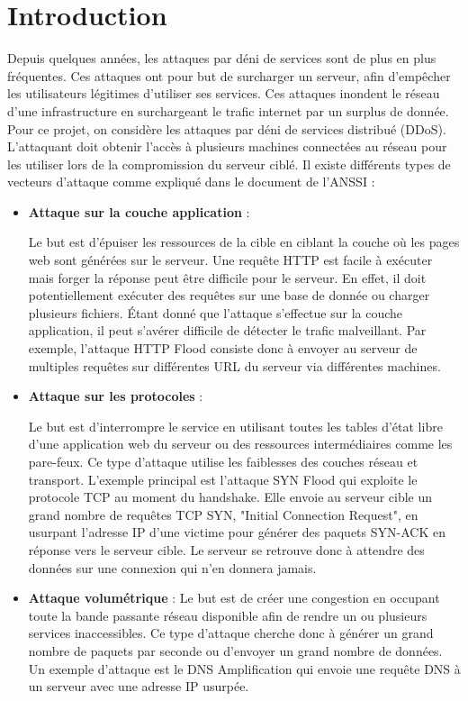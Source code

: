 \chapter*{Introduction}

\label{sec:intro}

Depuis quelques années, les attaques par déni de services sont de plus en plus fréquentes. Ces attaques ont pour but de surcharger un serveur, afin d'empêcher les utilisateurs légitimes d'utiliser ses services. Ces attaques inondent le réseau d'une infrastructure en surchargeant le trafic internet par un surplus de donnée. Pour ce projet, on considère les attaques par déni de services distribué (DDoS). L'attaquant doit obtenir l'accès à plusieurs machines connectées au réseau pour les utiliser lors de la compromission du serveur ciblé. Il existe différents types de vecteurs d'attaque comme expliqué dans le document de l'ANSSI \cite{Ans15} :

\begin{itemize}
    \item \textbf{Attaque sur la couche application} :

    Le but est d'épuiser les ressources de la cible en ciblant la couche où les pages web sont générées sur le serveur. Une requête HTTP est facile à exécuter mais forger la réponse peut être difficile pour le serveur. En effet, il doit potentiellement exécuter des requêtes sur une base de donnée ou charger plusieurs fichiers. Étant donné que l'attaque s'effectue sur la couche application, il peut s'avérer difficile de détecter le trafic malveillant. Par exemple, l'attaque HTTP Flood consiste donc à envoyer au serveur de multiples requêtes sur différentes URL du serveur via différentes machines.

    \item \textbf{Attaque sur les protocoles} :

    Le but est d'interrompre le service en utilisant toutes les tables d'état libre d'une application web du serveur ou des ressources intermédiaires comme les pare-feux. Ce type d'attaque utilise les faiblesses des couches réseau et transport. L'exemple principal est l'attaque SYN Flood qui exploite le protocole TCP au moment du handshake. Elle envoie au serveur cible un grand nombre de requêtes TCP SYN, "Initial Connection Request", en usurpant l'adresse IP d'une victime pour générer des paquets SYN-ACK en réponse vers le serveur cible. Le serveur se retrouve donc à attendre des données sur une connexion qui n'en donnera jamais.

    \item \textbf{Attaque volumétrique} : Le but est de créer une congestion en occupant toute la bande passante réseau disponible afin de rendre un ou plusieurs services inaccessibles. Ce type d'attaque cherche donc à générer un grand nombre de paquets par seconde ou d'envoyer un grand nombre de données. Un exemple d'attaque est le DNS Amplification qui envoie une requête DNS à un serveur avec une adresse IP usurpée.
\end{itemize}

